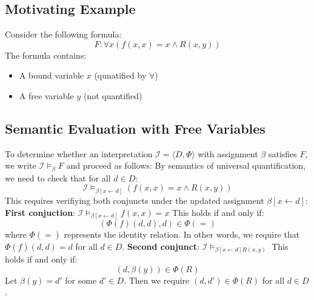 \documentclass[a4paper]{article}
\theoremstyle{definition}
\begin{document}
\subsection{Motivating Example}
Consider the following formula:
\[
  F: \forall x (f(x,x) = x \wedge R(x,y))
\]
The formula contains:
\begin{itemize}
	\item A bound variable \( x \) (qunatified by \( \forall \))
	\item A free variable \( y \) (not quantified)
\end{itemize}
\subsection{Semantic Evaluation with Free Variables}
To determine whether an interpretation \( \mathcal{I} = \langle D, \Phi \rangle \) with assignment \( \beta \) satisfies \( F \),
we write \( \mathcal{I} \models_{\beta} F \) and proceed as follows:
\vspace{1em}
\noindent
\newline
By semantics of universal quantification, we need to check that for all \( d \in D \):
\[
  \mathcal{I} \models_{\beta[x \leftarrow d]} (f(x,x) = x \wedge R(x,y))
\]
This requires verifiying both conjuncts under the updated assignment \( \beta[x \leftarrow d] \):
\vspace{1em}
\noindent
\newline
\textbf{First conjuction}: \( \mathcal{I} \models_{\beta[x \leftarrow d]} f(x,x) = x \)
\vspace{1em}
\noindent
\newline
This holds if and only if:
\[
  (\Phi(f)(d,d),d) \in \Phi(=)
\]
where \( \Phi(=) \) represents the identity relation. In other words, we require that \( \Phi(f)(d,d) = d \) for 
all \( d \in D \).
\vspace{1em}
\noindent
\newline
\textbf{Second conjunct}: \( \mathcal{I} \models_{\beta[x \leftarrow d] R(x,y)} \)
\vspace{1em}
\noindent
\newline
This holds if and only if:
\[
  (d, \beta(y)) \in \Phi(R)
\]
Let \( \beta(y) = d' \) for some \( d' \in D \). Then we require \( (d,d') \in \Phi(R) \) for all \( d \in D \).
\end{document}
